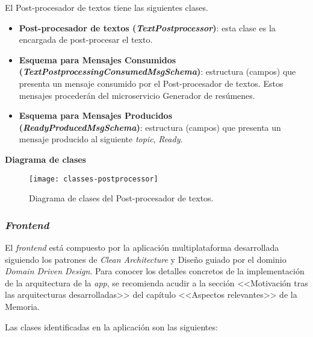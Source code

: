 El Post-procesador de textos tiene las siguientes clases.

\vspace{-0.2cm}
\begin{itemize} [\textbullet]
	\item \textbf{Post-procesador de textos (\emph{TextPostprocessor})}: esta clase es la encargada de post-procesar el texto.
	
	\item \textbf{Esquema para Mensajes Consumidos \\ (\emph{TextPostprocessingConsumedMsgSchema})}: estructura (campos) que presenta un mensaje consumido por el Post-procesador de textos. Estos mensajes procederán del microservicio Generador de resúmenes.
	
	\item \textbf{Esquema para Mensajes Producidos \\ (\emph{ReadyProducedMsgSchema})}: estructura (campos) que presenta un mensaje producido al siguiente \emph{topic}, \emph{Ready}.
\end{itemize}

\noindent
\textbf{Diagrama de clases}

\begin{figure}[h]
	\centering
	\texttt{[image: classes-postprocessor]}
	\vspace{-0.5cm}
	\caption{Diagrama de clases del Post-procesador de textos.}
\end{figure}


\subsubsection{\Large \emph{Frontend}}

El \emph{frontend} está compuesto por la aplicación multiplataforma desarrollada siguiendo los patrones de \emph{Clean Architecture} y Diseño guiado por el dominio \emph{Domain Driven Design}. Para conocer los detalles concretos de la implementación de la arquitectura de la \emph{app}, se recomienda acudir a la sección <<Motivación tras las arquitecturas desarrolladas>> del capítulo <<Aspectos relevantes>> de la Memoria.

Las clases identificadas en la aplicación son las siguientes:

